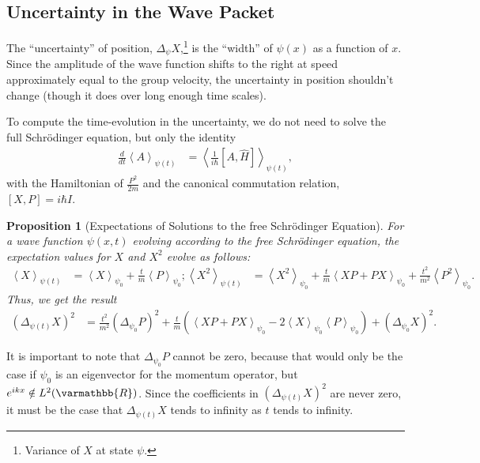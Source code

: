 \documentclass[12pt]{extarticle}
\newcommand{\R}{\varmathbb{R}}
\theoremstyle{plain}
\newtheorem*{proposition}{Proposition}%
\theoremstyle{definition}
\theoremstyle{remark}
\renewcommand{\newline}{\hfill\break}
\begin{document}
    \subsection{Uncertainty in the Wave Packet}%
    The ``uncertainty'' of position, $\Delta_{\psi}X$,\footnote{Variance of $X$ at state $\psi$.} is the ``width'' of $\psi(x)$ as a function of $x$. Since the amplitude of the wave function shifts to the right at speed approximately equal to the group velocity, the uncertainty in position shouldn't change (though it does over long enough time scales).\newline

    To compute the time-evolution in the uncertainty, we do not need to solve the full Schrödinger equation, but only the identity
    \begin{align*}
      \frac{d}{dt}\left\langle A\right\rangle_{\psi(t)} &= \left\langle\frac{1}{i\hbar}[A,\hat{H}]\right\rangle_{\psi(t)},
    \end{align*}
    with the Hamiltonian of $\frac{P^2}{2m}$ and the canonical commutation relation, $[X,P] = i\hbar I$.
    \begin{proposition}[Expectations of Solutions to the free Schrödinger Equation]
      For a wave function $\psi(x,t)$ evolving according to the free Schrödinger equation, the expectation values for $X$ and $X^2$ evolve as follows:
      \begin{align*}
        \left\langle X \right\rangle_{\psi(t)} &= \left\langle X\right\rangle_{\psi_0} + \frac{t}{m}\left\langle P \right\rangle_{\psi_0};
        \left\langle X^2 \right\rangle_{\psi(t)} &= \left\langle X^2 \right\rangle_{\psi_0} + \frac{t}{m}\left\langle XP + PX \right\rangle_{\psi_0} + \frac{t^2}{m^2}\left\langle P^2 \right\rangle_{\psi_0}.
      \end{align*}
      Thus, we get the result
      \begin{align*}
        \left(\Delta_{\psi(t)} X\right)^{2} &= \frac{t^2}{m^2}\left(\Delta_{\psi_0}P\right)^2 + \frac{t}{m}\left(\left\langle XP + PX \right\rangle_{\psi_0} - 2\left\langle X \right\rangle_{\psi_0}\left\langle P \right\rangle_{\psi_0}\right) + \left(\Delta_{\psi_0}X\right)^2.
      \end{align*}
    \end{proposition}
    It is important to note that $\Delta_{\psi_0}P$ cannot be zero, because that would only be the case if $\psi_0$ is an eigenvector for the momentum operator, but $e^{ikx}\notin L^{2}(\R)$. Since the coefficients in $\left(\Delta_{\psi(t)}X\right)^2$ are never zero, it must be the case that $\Delta_{\psi(t)}X$ tends to infinity as $t$ tends to infinity.
\end{document}

